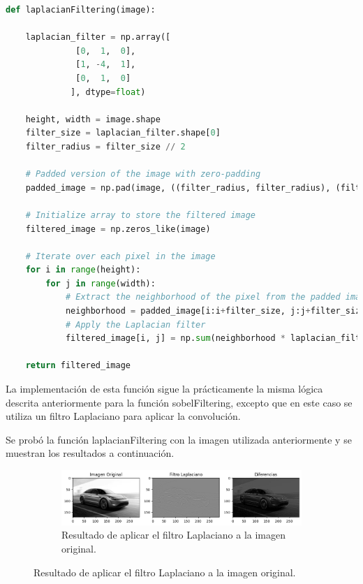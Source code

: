 \documentclass{article}
\begin{document}
    \begin{lstlisting}[language=Python, caption={Implementación laplacianFiltering},label={lst:laplacianFiltering}]
    def laplacianFiltering(image):

    laplacian_filter = np.array([
              [0,  1,  0],
              [1, -4,  1],
              [0,  1,  0]
             ], dtype=float)

    height, width = image.shape
    filter_size = laplacian_filter.shape[0]
    filter_radius = filter_size // 2

    # Padded version of the image with zero-padding
    padded_image = np.pad(image, ((filter_radius, filter_radius), (filter_radius, filter_radius)), mode='constant')

    # Initialize array to store the filtered image
    filtered_image = np.zeros_like(image)

    # Iterate over each pixel in the image
    for i in range(height):
        for j in range(width):
            # Extract the neighborhood of the pixel from the padded image
            neighborhood = padded_image[i:i+filter_size, j:j+filter_size]
            # Apply the Laplacian filter
            filtered_image[i, j] = np.sum(neighborhood * laplacian_filter)

    return filtered_image
    \end{lstlisting}
    
    \noindent
    La implementación de esta función sigue la prácticamente la misma lógica descrita anteriormente para la función sobelFiltering,
    excepto que en este caso se utiliza un filtro Laplaciano para aplicar la convolución.
    
    \noindent
    Se probó la función laplacianFiltering con la imagen utilizada anteriormente y se muestran los resultados a continuación.
    \begin{figure}[!ht]
        \centering
        \begin{subfigure}
            \centering
            \includegraphics[width=\linewidth]{img/laplacian}
            \caption{ Resultado de aplicar el filtro Laplaciano a la imagen original.}
            \label{fig:laplacian}
        \end{subfigure}
    \end{figure}
    
\end{document}
